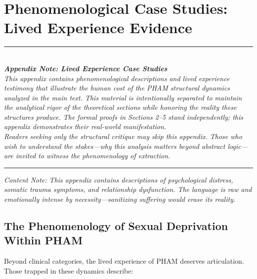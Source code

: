 \documentclass[12pt, letterpaper]{article}
\begin{document}
\newpage
\appendix
\section{Phenomenological Case Studies: Lived Experience Evidence}

\begin{center}
\rule{0.6\textwidth}{0.4pt}\\[0.5em]
\textit{\textbf{Appendix Note: Lived Experience Case Studies}}\\[0.3em]
\textit{This appendix contains phenomenological descriptions and lived experience testimony that illustrate the human cost of the PHAM structural dynamics analyzed in the main text. This material is intentionally separated to maintain the analytical rigor of the theoretical sections while honoring the reality these structures produce. The formal proofs in Sections 2--5 stand independently; this appendix demonstrates their real-world manifestation.}\\[0.5em]
\textit{Readers seeking only the structural critique may skip this appendix. Those who wish to understand the stakes---why this analysis matters beyond abstract logic---are invited to witness the phenomenology of extraction.}\\[0.5em]
\rule{0.6\textwidth}{0.4pt}
\end{center}

\vspace{1em}

\textit{Content Note: This appendix contains descriptions of psychological distress, somatic trauma symptoms, and relationship dysfunction. The language is raw and emotionally intense by necessity---sanitizing suffering would erase its reality.}

\vspace{1em}

\subsection{The Phenomenology of Sexual Deprivation Within PHAM}

Beyond clinical categories, the lived experience of PHAM deserves articulation. Those trapped in these dynamics describe:
\end{document}
